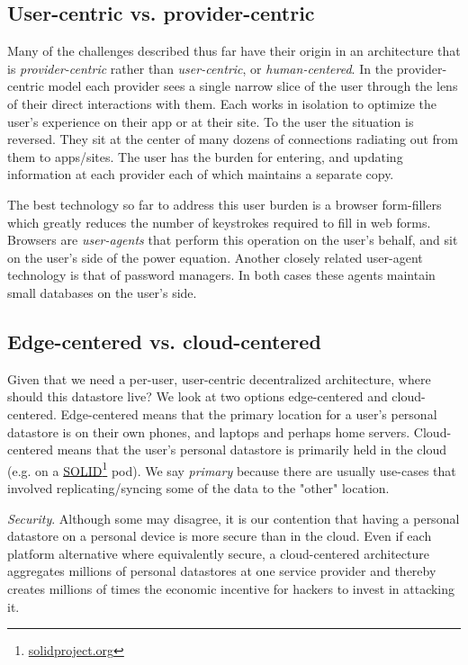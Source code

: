 \documentclass[11pt, oneside]{article}   	%
\newcommand{\hyperfootnote}[1][]{\def\ArgI{{#1}}\hyperfootnoteRelay}
\newcommand\hyperfootnoteRelay[2][]{\href{#1#2}{\ArgI}\footnote{\href{#1#2}{#2}}}
\begin{document}
\subsection{User-centric vs. provider-centric}

Many of the challenges described thus far have their origin in an architecture that is \emph{provider-centric} rather than \emph{user-centric}, or \emph{human-centered}. In the provider-centric model each provider sees a single narrow slice of the user through the lens of their direct interactions with them. Each works in isolation to optimize the user's experience on their app or at their site. To the user the situation is reversed. They sit at the center of many dozens of connections radiating out from them to apps/sites. The user has the burden for entering, and updating information at each provider each of which maintains a separate copy. 

The best technology so far to address this user burden is a browser form-fillers which greatly reduces the number of keystrokes required to fill in web forms. Browsers are \emph{user-agents} that perform this operation on the user's behalf, and sit on the user's side of the power equation. Another closely related user-agent technology is that of password managers. In both cases these agents maintain small databases on the user's side.

\subsection{Edge-centered vs. cloud-centered}
Given that we need a per-user, user-centric decentralized architecture, where should this datastore live? We look at two options edge-centered and cloud-centered. Edge-centered means that the primary location for a user's personal datastore is on their own phones, and laptops and perhaps home servers. Cloud-centered means that the user's personal datastore is primarily held in the cloud (e.g. on a \hyperfootnote[SOLID][https://]{solidproject.org} pod). We say \emph{primary} because there are usually use-cases that involved replicating/syncing some of the data to the "other" location. 

\emph{Security}. Although some may disagree, it is our contention that having a personal datastore on a personal device is more secure than in the cloud. Even if each platform alternative where equivalently secure, a cloud-centered architecture aggregates millions of personal datastores at one service provider and thereby creates millions of times the economic incentive for hackers to invest in attacking it. 
\end{document}
